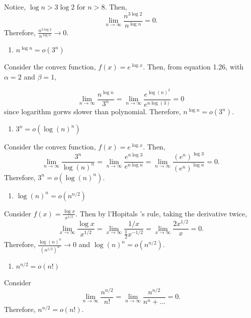 \documentclass[12pt,]{article}
\providecommand{\tightlist}{%
  \setlength{\itemsep}{0pt}\setlength{\parskip}{0pt}}
\begin{document}
Notice, \(\log n > 3\log 2\) for \(n>8\). Then,
\[\lim_{n\rightarrow \infty}\frac{n^{3 \log 2}}{n^{\log n}}=0.\]
Therefore, \(\frac{n^{3 \log 2}}{n^{\log n}}\rightarrow 0\).

\begin{enumerate}
\def\labelenumi{(\arabic{enumi})}
\setcounter{enumi}{6}
\tightlist
\item
  \(n^{\log n}= o\left(3^n\right)\)
\end{enumerate}

Consider the convex function, \(f(x) = e^{\log x}.\) Then, from equation
1.26, with \(\alpha = 2\) and \(\beta = 1,\)

\[\lim_{n\rightarrow\infty}\frac{n^{\log n}}{3^n}=\lim_{n\rightarrow\infty}\frac{e^{\log(n)^2}}{e^{n\log(3)}}=0\]
since logarithm gorws slower than polynomial. Therefore,
\(n^{\log n}= o\left(3^n\right)\).

\begin{enumerate}
\def\labelenumi{(\arabic{enumi})}
\setcounter{enumi}{7}
\tightlist
\item
  \(3^n= o\left( \log(n)^n\right)\)
\end{enumerate}

Consider the convex function, \(f(x) = e^{\log x}.\) Then,
\[\lim_{n\rightarrow\infty}\frac{3^n}{\log(n)^n}=\lim_{n\rightarrow\infty}\frac{e^{n\log 3}}{e^{n\log n}}=\lim_{n\rightarrow\infty}\frac{(e^n)^{\log 3}}{(e^n)^{\log n}}=0.\]
Therefore, \(3^n= o\left( \log(n)^n\right)\).

\begin{enumerate}
\def\labelenumi{(\arabic{enumi})}
\setcounter{enumi}{8}
\tightlist
\item
  \(\log(n)^n= o\left(n^{n/2}\right)\)
\end{enumerate}

Consider \(f(x) = \frac{\log x}{x^{1/2}}.\) Then by l'Hopitals 's rule,
taking the derivative twice,
\[\lim_{x\rightarrow\infty}\frac{\log x}{x^{1/2}}=\lim_{x\rightarrow\infty}\frac{1/x}{\frac{1}{2}x^{-1/2}}=\lim_{x\rightarrow\infty}\frac{2x^{1/2}}{x}=0.\]
Therefore, \(\frac{\log(n)^n}{(n^{1/2})^n}\rightarrow 0\) and
\(\log(n)^n= o\left(n^{n/2}\right)\).

\begin{enumerate}
\def\labelenumi{(\arabic{enumi})}
\setcounter{enumi}{9}
\tightlist
\item
  \(n^{n/2}= o\left(n!\right)\)
\end{enumerate}

Consider
\[\lim_{n\rightarrow\infty} \frac{n^{n/2}}{n!}=\lim_{n\rightarrow\infty} \frac{n^{n/2}}{n^n + ...}=0.\]
Therefore, \(n^{n/2} = o\left( n!\right)\).
\end{document}
